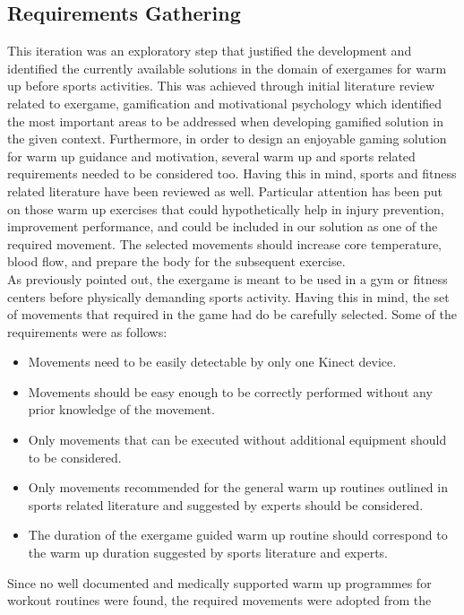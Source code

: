 \subsection{Requirements Gathering}
This iteration was an exploratory step that justified the development and identified the currently available solutions in the domain of exergames for warm up before sports activities. This was achieved through initial literature review related to exergame, gamification and motivational psychology which identified the most important areas to be addressed when developing gamified solution in the given context. Furthermore, in order to design an enjoyable gaming solution for warm up guidance and motivation, several warm up and sports related requirements needed to be considered too. Having this in mind, sports and fitness related literature have been reviewed as well. Particular attention has been put on those warm up exercises that could hypothetically help in injury prevention, improvement performance, and could be included in our solution as one of the required movement. The selected movements should increase core temperature, blood flow, and prepare the body for the subsequent exercise.\\ As previously pointed out, the exergame is meant to be used in a gym or fitness centers before physically demanding sports activity. Having this in mind, the set of movements that required in the game had do be carefully selected. Some of the requirements were as follows:
\begin{itemize}
\item Movements need to be easily detectable by only one Kinect device.
\item Movements should be easy enough to be correctly performed without any prior knowledge of the movement.
\item Only movements that can be executed without additional equipment should to be considered.   
\item Only movements recommended for the general warm up routines outlined in sports related literature and suggested by experts should be considered.
\item The duration of the exergame guided warm up routine should correspond to the warm up duration suggested by sports literature and experts.
\end{itemize}
Since no well documented and medically supported warm up programmes for workout routines were found,  the required movements were adopted from the 
